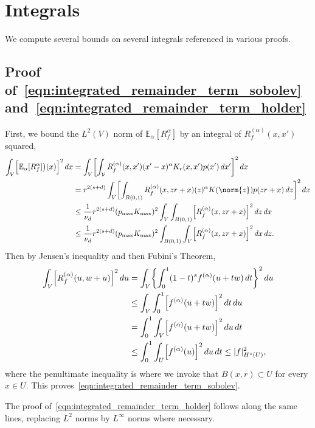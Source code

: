 \documentclass{article}
\newcommand{\1}{\mathbf{1}}
\newcommand{\Vset}{\mathcal{V}}
\newcommand{\Leb}{L}
\newcommand{\Ebb}{\mathbb{E}}
\theoremstyle{alden}
\theoremstyle{aldenthm}
\theoremstyle{definition}
\theoremstyle{remark}
\begin{document}
\section{Integrals}
We compute several bounds on several integrals referenced in various proofs.

\subsection{Proof of~\eqref{eqn:integrated_remainder_term_sobolev} and~\eqref{eqn:integrated_remainder_term_holder}}
\label{subsec:proof_integrated_remainder_terms}

First, we bound the $\Leb^2(V)$ norm of $\Ebb_{\alpha}[R_f^{\alpha}]$ by an integral of $R_f^{(\alpha)}(x,x')$ squared,
\begin{align*}
\int_{V} \Bigl[\Ebb_{\alpha}[R_f^{\alpha}]\bigr)(x)\Bigr]^2 \,dx & =  \int_{V} \biggl[\int_{\Vset} R_f^{(\alpha)}(x,x') (x' - x)^{\alpha} K_r(x,x') p(x') \,dx' \biggr]^2 \,dx \\
& = r^{2(s + d)} \int_{V} \biggl[\int_{B(0,1)} R_f^{(\alpha)}(x,zr + x) (z)^{\alpha} K(\norm{z}) p(zr + x) \,dz \biggr]^2 \,dx \\
& \leq \frac{1}{\nu_d}r^{2(s + d)} (p_{\max} K_{\max})^2 \int_{V} \int_{B(0,1)} \Bigl[R_f^{(\alpha)}(x,zr + x) \Bigr]^2  \,dz  \,dx \\
& \leq \frac{1}{\nu_d}r^{2(s + d)} (p_{\max} K_{\max})^2 \int_{B(0,1)} \int_{V}  \Bigl[R_f^{(\alpha)}(x,zr + x) \Bigr]^2  \,dx  \,dz.
\end{align*}
Then by Jensen's inequality and then Fubini's Theorem,
\begin{align*}
\int_{V} \Bigl[R_f^{(\alpha)}(u,w + u)\Bigr]^2 \,du & = \int_{V} \biggl\{\int_{0}^{1} (1 - t)^{s} f^{(\alpha)}(u + tw) \,dt  \biggr\}^2 \,du \\ 
& \leq \int_{V} \int_{0}^{1} \Bigl[f^{(\alpha)}(u + tw)\Bigr]^2 \,dt   \,du \\
& = \int_{0}^{1} \int_{V} \Bigl[f^{(\alpha)}(u + tw)\Bigr]^2 \,du  \,dt \\
& \leq \int_{0}^{1} \int_{U} \Bigl[f^{(\alpha)}(u)\Bigr]^2 \,du  \,dt \leq |f|_{H^s(U)}^2,
\end{align*}
where the penultimate inequality is where we invoke that $B(x,r) \subset U$ for every $x \in U$. This proves~\eqref{eqn:integrated_remainder_term_sobolev}.

The proof of~\eqref{eqn:integrated_remainder_term_holder} follows along the same lines, replacing $\Leb^2$ norms by $\Leb^{\infty}$ norms where necessary.
\end{document}
